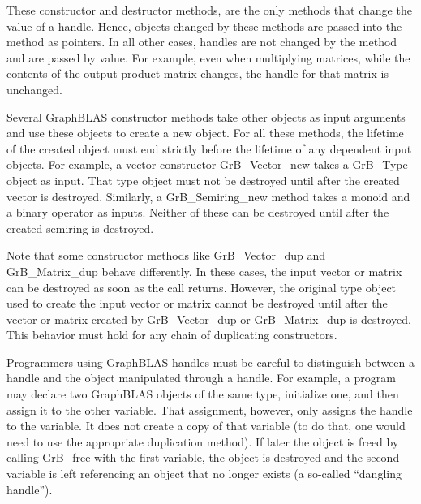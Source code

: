 
These constructor and destructor methods, are the only methods that change 
the value of a handle.  Hence, objects changed by these methods are passed
into the method as pointers.  In all other cases, handles are not changed by the 
method and are passed by value.  For example, even when multiplying matrices, 
while the contents of the output product matrix changes, the handle for that 
matrix is unchanged. 

Several GraphBLAS constructor methods take other objects as input arguments
and use these objects to create a new object. For all these
methods, the lifetime of the created object must end strictly before
the lifetime of any dependent input objects. For example, a vector constructor
{\sf GrB\_Vector\_new} takes a {\sf GrB\_Type} object as input. That type
object must not be destroyed until after the created vector is destroyed.
Similarly, a {\sf GrB\_Semiring\_new} method takes a monoid and
a binary operator as inputs. Neither of these can be destroyed until
after the created semiring is destroyed.

Note that some constructor methods like {\sf GrB\_Vector\_dup} and 
{\sf GrB\_Matrix\_dup} behave differently. In these cases, the input 
vector or matrix can
be destroyed as soon as the call returns. However, the original type
object used to create the input vector or matrix cannot be destroyed
until after the vector or matrix created by {\sf GrB\_Vector\_dup} or
{\sf GrB\_Matrix\_dup} is destroyed.  This behavior must hold for any
chain of duplicating constructors.

Programmers using GraphBLAS handles must be careful to distinguish between a 
handle and the object manipulated through a handle.  For example, a program may 
declare two GraphBLAS objects of the same type, initialize one, and then assign 
it to the other variable.  That assignment, however, only assigns the handle to 
the variable.  It does not create a copy of that variable (to do that, one 
would need to use the appropriate duplication method).  If later the object is 
freed by calling {\sf GrB\_free} with the first variable, the object is 
destroyed and the second variable is left referencing an object that no longer 
exists (a so-called ``dangling handle'').


